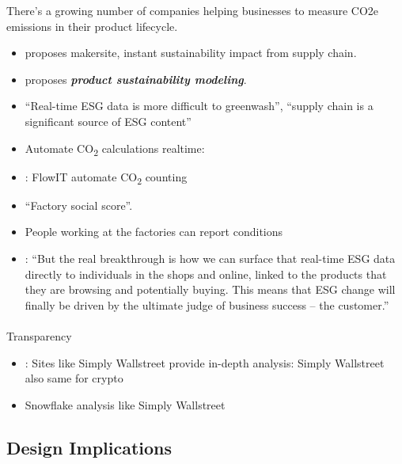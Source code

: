 \documentclass[
  letterpaper,
  DIV=11,
  numbers=noendperiod]{scrartcl}
\makeatletter
\let\oldparagraph\paragraph
\renewcommand{\paragraph}{
    \@ifstar
      \xxxParagraphStar
      \xxxParagraphNoStar
  }
\newcommand{\xxxParagraphStar}[1]{\oldparagraph*{#1}\mbox{}}
\newcommand{\xxxParagraphNoStar}[1]{\oldparagraph{#1}\mbox{}}
\makeatother
\begin{document}
There's a growing number of companies helping businesses to measure CO2e
emissions in their product lifecycle.

\begin{itemize}
\item
  \citet{kylewiggersMakersiteLands18M2022} proposes makersite, instant
  sustainability impact from supply chain.
\item
  \citet{makersiteImproveYourProduct} proposes \textbf{\emph{product
  sustainability modeling}}.
\item
  \citet{timnicolleRealtimeESGData2021} ``Real-time ESG data is more
  difficult to greenwash'', ``supply chain is a significant source of
  ESG content''
\item
  Automate CO\textsubscript{2} calculations realtime:
\item
  \citet{indrekkaldEestiITfirmaAutomatiseeris2022}: FlowIT automate
  CO\textsubscript{2} counting
\item
  ``Factory social score''.
\item
  People working at the factories can report conditions
\item
  \citet{ESGAnalyticsRealtime}: ``But the real breakthrough is how we
  can surface that real-time ESG data directly to individuals in the
  shops and online, linked to the products that they are browsing and
  potentially buying. This means that ESG change will finally be driven
  by the ultimate judge of business success -- the customer.''
\end{itemize}

\paragraph{Transparency}\label{transparency}

\begin{itemize}
\item
  \citet{SimplyWallSt}: Sites like Simply Wallstreet provide in-depth
  analysis: Simply Wallstreet also same for crypto
\item
  Snowflake analysis like Simply Wallstreet
\end{itemize}

\subsection{Design Implications}\label{design-implications-4}
\end{document}
